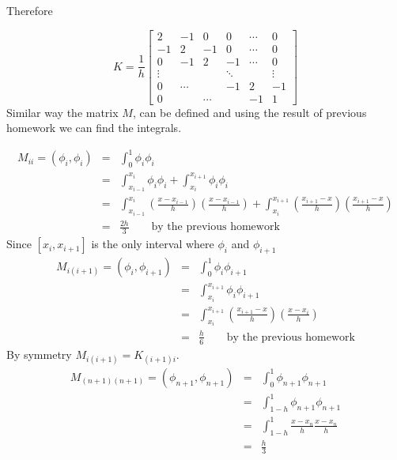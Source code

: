 {\begin{solution}
\begin{enumerate}
Therefore

\[
K= \frac{1}{h}\left[\begin{array}{rrrrrrr}
              2 & -1 & 0 & 0 &  \cdots & 0 \\[0.25em]
               -1 & 2 & -1 &0 & \cdots & 0 \\
                0& -1 & 2 & -1 & \cdots & 0\\
                 \vdots & & &\ddots &  & \vdots \\[0.25em]
                 0 & \cdots &  & -1& 2 & -1 \\ 
                 0 & &\cdots &  & -1 & 1 
                   \end{array}\right]
                   \]
Similar way the matrix $M$, can be defined and using the result of previous homework we can find the integrals.

\begin{eqnarray*}
M_{ii} = (\phi_i, \phi_i) &=& \int_0^1 \phi_i \phi_i\\
												&=& \int_{x_{i-1}}^{x_i}  \phi_i \phi_i + \int_{x_{i}}^{x_{i+1}}  \phi_i \phi_i\\
												&=&\int_{x_{i-1}}^{x_i}  (\frac{x-x_{i-1}}{h}) ( \frac{x-x_{i-1}}{h}) + \int_{x_{i}}^{x_{i+1}}   (\frac{x_{i+1}-x}{h}) (\frac{x_{i+1}-x}{h}) \\
												&=& \frac{2h}{3} \qquad \mbox{by the previous homework}
\end{eqnarray*}
Since $[x_i, x_{i+1}]$ is the only interval where $\phi_i$ and $\phi_{i+1}$ 
\begin{eqnarray*}
M_{i(i+1)} = (\phi_i, \phi_{i+1}) &=& \int_0^1 \phi_i \phi_{i+1}\\
												&=& \int_{x_{i}}^{x_{i+1}}  \phi_i \phi_{i+1}\\
												&=&\int_{x_{i}}^{x_{i+1}}   (\frac{x_{i+1}-x}{h})  (\frac{x-x_{i}}{h}) \\
												&=& \frac{h}{6} \qquad \mbox{by the previous homework}
\end{eqnarray*}
By symmetry $M_{i(i+1)}= K_{(i+1)i}$.
\begin{eqnarray*}
M_{(n+1)(n+1)} = (\phi_{n+1}, \phi_{n+1}) &=& \int_0^1 \phi_{n+1} \phi_{n+1}\\
												&=& \int_{1-h}^{1}  \phi_{n+1} \phi_{n+1}\\
												&=&\int_{1-h}^{1}  \frac{x - x_{n}}{h}  \frac{x - x_{n}}{h}\\
												&=& \frac{h}{3}
\end{eqnarray*}


\end{enumerate}
\end{solution}}
